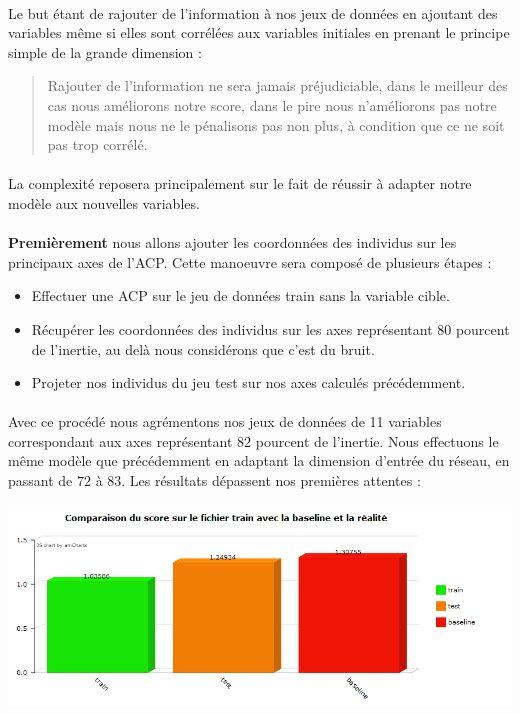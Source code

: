 \documentclass[14pt, openany]{article}
\begin{document}
\paragraph{}
Le but étant de rajouter de l'information à nos jeux de données en ajoutant des variables même si elles sont corrélées aux variables initiales en prenant le principe simple de la grande dimension :
\begin{quote}
    \og Rajouter de l'information ne sera jamais préjudiciable, dans le meilleur des cas nous améliorons notre score, dans le pire nous n'améliorons pas notre modèle mais nous ne le pénalisons pas non plus, à condition que ce ne soit pas trop corrélé.\fg{}
\end{quote}
\paragraph{}
La complexité reposera principalement sur le fait de réussir à adapter notre modèle aux nouvelles variables.

\paragraph{}
\textbf{Premièrement} nous allons ajouter les coordonnées des individus sur les principaux axes de l'ACP. Cette manoeuvre sera composé de plusieurs étapes :
\begin{itemize}
    \item Effectuer une ACP sur le jeu de données train sans la variable cible.
    \item Récupérer les coordonnées des individus sur les axes représentant $80$ pourcent de l'inertie, au delà nous considérons que c'est du bruit.
    \item Projeter nos individus du jeu test sur nos axes calculés précédemment.
\end{itemize}

\paragraph{}
Avec ce procédé nous agrémentons nos jeux de données de 11 variables correspondant aux axes représentant $82$ pourcent de l'inertie. Nous effectuons le même modèle que précédemment en adaptant la dimension d'entrée du réseau, en passant de $72$ à $83$. Les résultats dépassent nos premières attentes :

\begin{center}
\includegraphics[scale=0.7]{Images/deep2keras.png}
\end{center}
\end{document}
